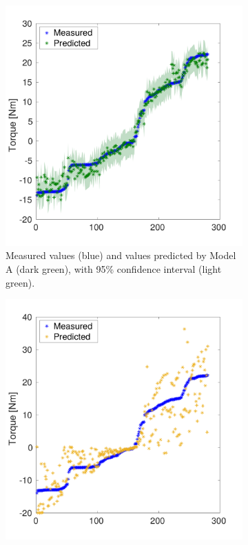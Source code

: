 \begin{figure}%
  \centering%
  \begin{subfigure}[t]{0.48\textwidth}%
    \centering%
    \includegraphics[width=\textwidth]{images/summer_school_study/measured_optimized_torque_A.pdf}%
    \caption{Measured values (blue) and values predicted by Model A (dark green), with 95\% confidence interval (light green).}%
    \label{fig:measured_optimized_torque_A}%
  \end{subfigure}%
  \quad
  \begin{subfigure}[t]{0.48\textwidth}%
    \centering%
    \includegraphics[width=\textwidth]{images/summer_school_study/measured_optimized_torque_B.pdf}%

\end{subfigure}
\end{figure}
